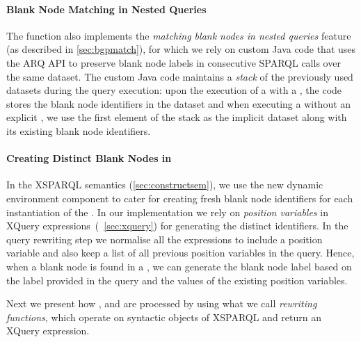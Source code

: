 \paragraph*{Blank Node Matching in Nested Queries}
\label{sec:blank-node-matching-nested}
%
The  function also implements the \emph{matching blank nodes in nested queries} feature (as
described in \cref{sec:bgpmatch}), for which we rely on custom Java code that uses the ARQ API to preserve blank node
labels in consecutive SPARQL calls over the same dataset.
%
The custom Java code maintains a \emph{stack} of the previously used datasets during the query execution: upon the
execution of a \SparqlForClause with a \DatasetClause, the code stores the blank node identifiers in the dataset and
when executing a \SparqlForClause without an explicit \DatasetClause, we use the first element of the stack as the
implicit dataset along with its existing blank node identifiers.


\paragraph*{Creating Distinct Blank Nodes in }
\label{sec:blank-node-construct}
%
In the XSPARQL semantics (\cref{sec:constructsem}), we use the new  dynamic environment
component to cater for creating fresh blank node identifiers for each instantiation of the \ConstructClause.
%
In our implementation we rely on \emph{position variables} in XQuery \FOR expressions~(\cf~\cref{sec:xquery}) for
generating the distinct identifiers.
%
In the query rewriting step we normalise all the \FOR expressions to include a position variable and also keep a list of
all previous position variables in the query.  Hence, when a blank node is found in a \ConstructClause, we can generate
the blank node label based on the label provided in the query and the values of the existing position variables.




\bigskip

Next we present how ,  and  are processed by using what we call
\emph{rewriting functions}, which operate on syntactic objects of XSPARQL and return an XQuery expression.


